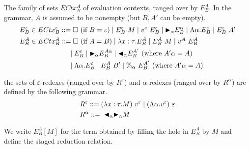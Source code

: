 \begin{definition}
	The family of sets $ECtx^A_B$ of evaluation contexts, ranged over by $E^A_B$.
	In the grammar, $A$ is assumed to be nonempty (but $B,A'$ can be empty).
	\begin{align*}
		 & E^\varepsilon_B \in ECtx^\varepsilon_B ::= \square\ (\text{if\ } B = \varepsilon)
		\mid E^\varepsilon_B\ M \mid v^e\ E^\varepsilon_B \mid \TB_\alpha E^\alpha_B
		\mid \Lambda\alpha.E^\varepsilon_B \mid E^\varepsilon_B\ A'                                                                       \\
		 & E^A_B \in ECtx^A_B                     ::= \square\ (\text{if } A = B) \mid \lambda x:\tau.E^A_B \mid E^A_B\ M \mid v^A\ E^A_B \\
		 & \hspace{25mm} \mid E^\varepsilon_B \mid \TB_\alpha E^{A\alpha}_B \mid \TBL_\alpha E^{A'}_B \ (\text{where } A'\alpha = A)      \\
		 & \hspace{25mm} \mid \Lambda\alpha.E^\varepsilon_B \mid E^A_B\ B' \mid \%_\alpha\ E^{A'}_B \ (\text{where } A'\alpha = A)        \\
	\end{align*}
\end{definition}

\begin{definition}[Redex]
	the sets of $\varepsilon$-redexes (ranged over by $R^\varepsilon$) and $\alpha$-redexes (ranged over by $R^\alpha$) are defined by the following grammar.
	\begin{align*}
		 & R^\varepsilon ::= (\lambda x:\tau.M)\ v^\varepsilon \mid (\Lambda\alpha.v^\varepsilon)\ \varepsilon \\
		 & R^\alpha      ::=\ {\mathop{\blacktriangleleft}}_\alpha {\mathop{\blacktriangleright}}_\alpha M                                                         \\
	\end{align*}
\end{definition}


We write $E^A_B[M]$ for the term obtained by filling the hole in $E^A_B$ by $M$
and define the staged reduction relation.

